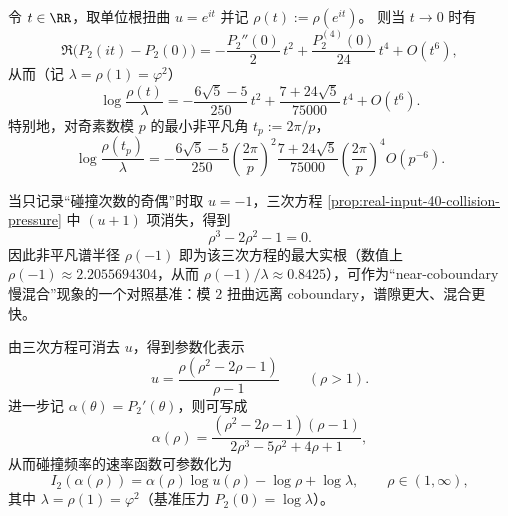 \begin{corollary}[单位根扭曲下的四阶谱隙渐近]\label{cor:real-input-40-collision-twist-fourth}
令 $t\in\RR$，取单位根扭曲 $u=e^{it}$ 并记
\(
\rho(t):=\rho(e^{it})
\)。
则当 $t\to 0$ 时有
\[
\Re\bigl(P_2(it)-P_2(0)\bigr)
=-\frac{P_2''(0)}{2}\,t^2+\frac{P_2^{(4)}(0)}{24}\,t^4+O(t^6),
\]
从而（记 $\lambda=\rho(1)=\varphi^2$）
\[
\boxed{\
\log\frac{\rho(t)}{\lambda}
=-\frac{6\sqrt5-5}{250}\,t^2+\frac{7+24\sqrt5}{75000}\,t^4+O(t^6).
\ }
\]
特别地，对奇素数模 $p$ 的最小非平凡角 $t_p:=2\pi/p$，
\[
\log\frac{\rho(t_p)}{\lambda}
=-\frac{6\sqrt5-5}{250}\left(\frac{2\pi}{p}\right)^2
\frac{7+24\sqrt5}{75000}\left(\frac{2\pi}{p}\right)^4
O\!\left(p^{-6}\right).
\]
\end{corollary}

\begin{remark}\label{rem:real-input-40-collision-parity}
当只记录“碰撞次数的奇偶”时取 $u=-1$，三次方程 \eqref{prop:real-input-40-collision-pressure} 中 $(u+1)$ 项消失，得到
\[
\rho^3-2\rho^2-1=0.
\]
因此非平凡谱半径 $\rho(-1)$ 即为该三次方程的最大实根（数值上 $\rho(-1)\approx 2.2055694304$，从而 $\rho(-1)/\lambda\approx 0.8425$），可作为“near-coboundary 慢混合”现象的一个对照基准：模 $2$ 扭曲远离 coboundary，谱隙更大、混合更快。
\end{remark}

\begin{remark}[碰撞频率的大偏差参数化]\label{rem:real-input-40-collision-ldp-param}
由三次方程可消去 $u$，得到参数化表示
\[
u=\frac{\rho(\rho^2-2\rho-1)}{\rho-1}\qquad(\rho>1).
\]
进一步记 $\alpha(\theta)=P_2'(\theta)$，则可写成
\[
\alpha(\rho)=\frac{(\rho^2-2\rho-1)(\rho-1)}{2\rho^3-5\rho^2+4\rho+1},
\]
从而碰撞频率的速率函数可参数化为
\[
I_2(\alpha(\rho))=\alpha(\rho)\log u(\rho)-\log\rho+\log\lambda,\qquad \rho\in(1,\infty),
\]
其中 \(\lambda=\rho(1)=\varphi^2\)（基准压力 \(P_2(0)=\log\lambda\)）。
\end{remark}

